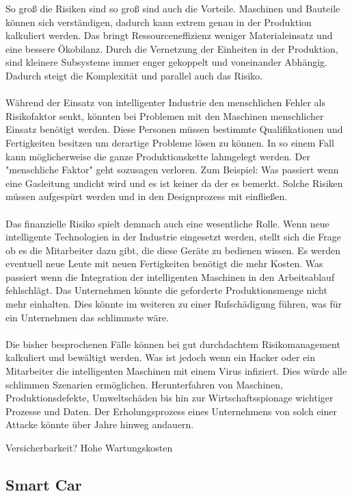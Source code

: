\documentclass{report}
\begin{document}
So groß die Risiken sind so groß sind auch die Vorteile. Maschinen und Bauteile können sich verständigen, dadurch kann extrem genau in der Produktion kalkuliert werden. Das bringt Ressourceneffizienz weniger Materialeinsatz und eine bessere Ökobilanz. 
Durch die Vernetzung der Einheiten in der Produktion, sind kleinere Subsysteme immer enger gekoppelt und voneinander Abhängig. Dadurch steigt die Komplexität und parallel auch das Risiko.
\\
\\
Während der Einsatz von intelligenter Industrie den menschlichen Fehler als Risikofaktor senkt, könnten bei Problemen mit den Maschinen menschlicher Einsatz benötigt werden. Diese Personen müssen bestimmte Qualifikationen und Fertigkeiten besitzen um derartige Probleme lösen zu können. In so einem Fall kann möglicherweise die ganze Produktionskette lahmgelegt werden. Der "menschliche Faktor" geht sozusagen verloren. Zum Beispiel: Was passiert wenn eine Gasleitung undicht wird und es ist keiner da der es bemerkt. Solche Risiken müssen aufgespürt werden und in den Designprozess mit einfließen.
\\
\\
Das finanzielle Risiko spielt demnach auch eine wesentliche Rolle. Wenn neue intelligente Technologien in der Industrie eingesetzt werden, stellt sich die Frage ob es die Mitarbeiter dazu gibt, die diese Geräte zu bedienen wissen. Es werden eventuell neue Leute mit neuen Fertigkeiten benötigt die mehr Kosten. Was passiert wenn die Integration der intelligenten Maschinen in den Arbeitsablauf fehlschlägt. Das Unternehmen könnte die geforderte Produktionsmenge nicht mehr einhalten. Dies könnte im weiteren zu einer Rufschädigung führen, was für ein Unternehmen das schlimmste wäre.
\\
\\
Die bisher besprochenen Fälle können bei gut durchdachtem Risikomanagement kalkuliert und bewältigt werden. Was ist jedoch wenn ein Hacker oder ein Mitarbeiter die intelligenten Maschinen mit einem Virus infiziert. Dies würde alle schlimmen Szenarien ermöglichen. Herunterfahren von Maschinen, Produktionsdefekte, Umweltschäden bis hin zur Wirtschaftsspionage wichtiger Prozesse und Daten. Der Erholungsprozess eines Unternehmens von solch einer Attacke könnte über Jahre hinweg andauern.

Versicherbarkeit?
Hohe Wartungskosten

\subsection{Smart Car}
\end{document}
